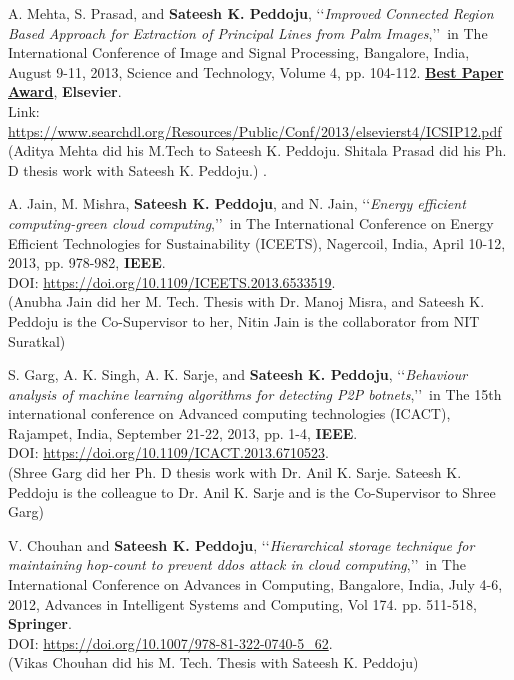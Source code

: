 \begin{etaremune}
	
	\item
	A. Mehta, S. Prasad, and  \textbf{Sateesh K. Peddoju}, \lq\lq \textit{Improved Connected Region Based Approach for Extraction of Principal Lines from Palm Images},\rq\rq\, in The International Conference of Image and Signal Processing, Bangalore, India, August 9-11, 2013, Science and Technology, Volume 4, pp. 104-112. \underline{\textbf{Best Paper Award}}, \textbf{Elsevier}. \\ Link: \url{https://www.searchdl.org/Resources/Public/Conf/2013/elsevierst4/ICSIP12.pdf} \\(Aditya Mehta did his M.Tech to Sateesh K. Peddoju. Shitala Prasad did his Ph. D thesis work with Sateesh K. Peddoju.) . 


	
	\item
	A. Jain, M. Mishra, \textbf{Sateesh K. Peddoju}, and N. Jain, \lq\lq \textit{Energy efficient computing-green cloud computing},\rq\rq\, in The International Conference on Energy Efficient Technologies for Sustainability (ICEETS), Nagercoil, India, April 10-12, 2013, pp. 978-982, \textbf{IEEE}. \\DOI: \url{https://doi.org/10.1109/ICEETS.2013.6533519}. \\(Anubha Jain did her M. Tech. Thesis with Dr. Manoj Misra, and Sateesh K. Peddoju is the Co-Supervisor to her, Nitin Jain is the collaborator from NIT Suratkal)
	
	\item
	S. Garg, A. K. Singh, A. K. Sarje, and \textbf{Sateesh K. Peddoju}, \lq\lq \textit{Behaviour analysis of machine learning algorithms for detecting P2P botnets},\rq\rq\, in The 15th international conference on Advanced computing technologies (ICACT), Rajampet, India, September 21-22, 2013, pp. 1-4,  \textbf{IEEE}. \\DOI: \url{https://doi.org/10.1109/ICACT.2013.6710523}.	\\(Shree Garg did her Ph. D thesis work with Dr. Anil K. Sarje.  Sateesh K. Peddoju is the colleague to Dr. Anil K. Sarje and is the Co-Supervisor to Shree Garg)

	
	\item
	V. Chouhan and \textbf{Sateesh K. Peddoju}, \lq\lq \textit{Hierarchical storage technique for maintaining hop-count to prevent ddos attack in cloud computing},\rq\rq\, in The International Conference on Advances in Computing, Bangalore, India, July 4-6, 2012, Advances in Intelligent Systems and Computing, Vol 174. pp. 511-518, \textbf{Springer}. \\DOI: \url{https://doi.org/10.1007/978-81-322-0740-5_62}. \\(Vikas Chouhan did his M. Tech. Thesis with Sateesh K. Peddoju)
	

\end{etaremune}
